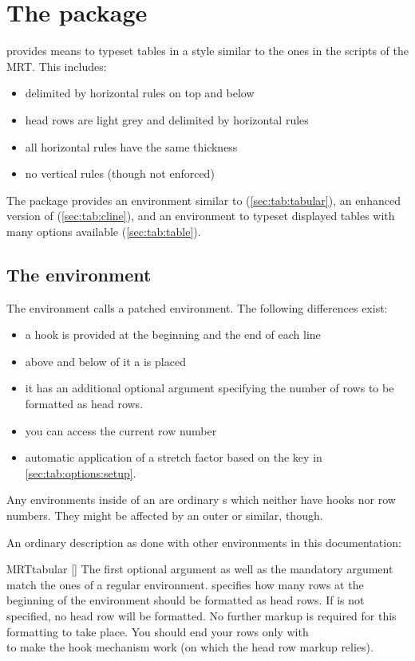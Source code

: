 \chapter{The  package}
 provides means to typeset tables in a style similar to the ones in
the scripts of the MRT. This includes:
\begin{itemize}
  \item delimited by horizontal rules on top and below
  \item head rows are light grey and delimited by horizontal rules
  \item all horizontal rules have the same thickness
  \item no vertical rules (though not enforced)
\end{itemize}

The package provides an environment similar to 
(\autoref{sec:tab:tabular}), an enhanced version of 
(\autoref{sec:tab:cline}), and an environment to typeset displayed tables with
many options available (\autoref{sec:tab:table}).

\section{The  environment}\label{sec:tab:tabular}%
The  environment calls a patched  environment. The
following differences exist:
\begin{itemize}
  \item a hook is provided at the beginning and the end of each line 
  \item above and below of it a  is placed
  \item it has an additional optional argument specifying the number of rows to
    be formatted as head rows.
  \item you can access the current row number
  \item automatic application of a stretch factor based on the  key in \autoref{sec:tab:options:setup}.
\end{itemize}
Any  environments inside of an  are ordinary
s which neither have hooks nor row numbers. They might be affected
by an outer  or similar, though.

An ordinary description as done with other environments in this documentation:
\begin{describeenv}{MRTtabular}%
  []
  The first optional argument as well as the mandatory argument match the ones
  of a regular  environment.  specifies how many
  rows at the beginning of the environment should be formatted as head rows. If
   is not specified, no head row will be formatted. No
  further markup is required for this formatting to take place. You should end
  your rows only with \texttt{\string\\} to make the hook mechanism work (on
  which the head row markup relies).
\end{describeenv}%

